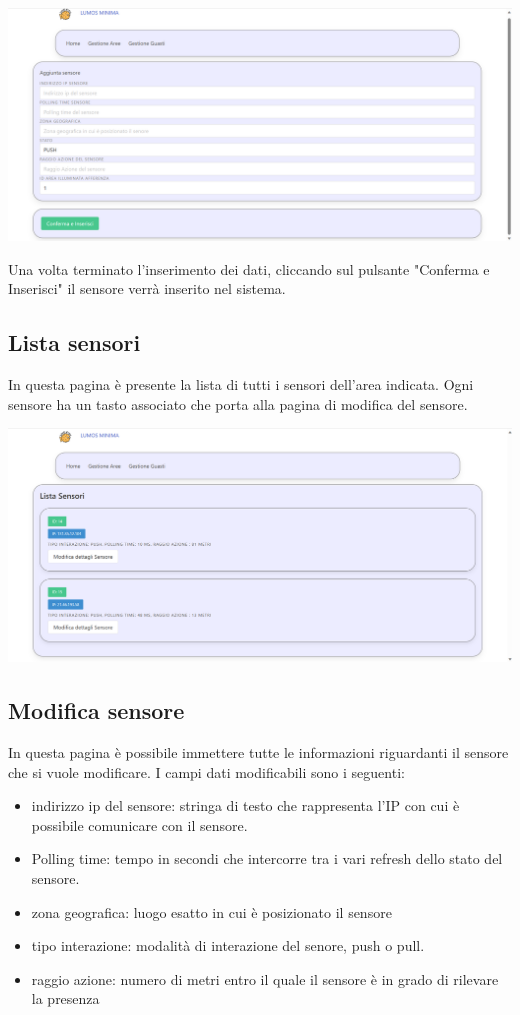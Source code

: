 \documentclass[9pt]{article}
\begin{document}
\begin{itemize}
\begin{center}
	\includegraphics[scale=0.3]{Aggiungi_sensore.png}
\end{center}

Una volta terminato l'inserimento dei dati, cliccando sul pulsante "Conferma e Inserisci"
il sensore verrà inserito nel sistema.

\subsection{Lista sensori}
In questa pagina è presente la lista di tutti i sensori dell'area indicata.
Ogni sensore ha un tasto associato che porta alla pagina di modifica del sensore. 

\begin{center}
	\includegraphics[scale=0.3]{Lista_sensori.png}
\end{center}

\subsection{Modifica sensore}
In questa pagina è possibile immettere tutte le informazioni riguardanti il sensore che si vuole modificare.
I campi dati modificabili sono i seguenti:
\begin{itemize}
	\item indirizzo ip del sensore: stringa di testo che rappresenta l'IP con cui è possibile comunicare con il sensore.
	\item Polling time: tempo in secondi che intercorre tra i vari refresh dello stato del sensore.
	\item zona geografica: luogo esatto in cui è posizionato il sensore
	\item tipo interazione: modalità di interazione del senore, push o pull.
	\item raggio azione: numero di metri entro il quale il sensore è in grado di rilevare la presenza
\end{itemize}


\end{itemize}
\end{document}
